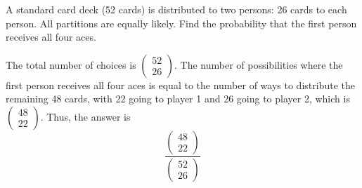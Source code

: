 \documentclass[a4paper, 12pt]{exam}
\begin{document}
\begin{questions}
\question A standard card deck (52 cards) is distributed to two persons: 26 cards to each person. All partitions are equally likely. Find the probability that the first person receives all four aces.
\begin{solution}
	The total number of choices is $\left(\begin{aligned}52\\26\end{aligned}\right)$. The number of possibilities where the first person receives all four aces is equal to the number of ways to distribute the remaining 48 cards, with 22 going to player 1 and 26 going to player 2, which is $\left(\begin{aligned}48\\22\end{aligned}\right)$. Thus, the answer is
	\begin{equation*}
	\frac{\left(\begin{aligned}48\\22\end{aligned}\right)}{\left(\begin{aligned}52\\26\end{aligned}\right)}
	\end{equation*}
\end{solution}


\end{questions}
\end{document}
